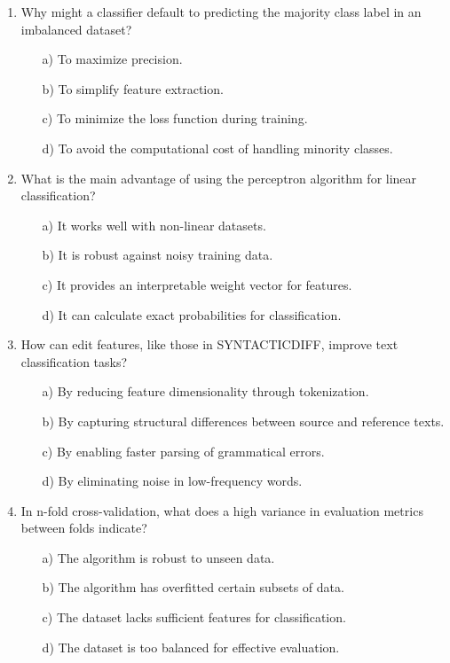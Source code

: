 \documentclass[8pt]{extarticle}
\begin{document}
\begin{multicols}{2}
\begin{enumerate}
\item Why might a classifier default to predicting the majority class label in an imbalanced dataset?
\begin{itemize}
\item[a)] To maximize precision.
\item[b)] To simplify feature extraction.
\item[c)] To minimize the loss function during training.
\item[d)] To avoid the computational cost of handling minority classes.
\end{itemize}


\item What is the main advantage of using the perceptron algorithm for linear classification?
\begin{itemize}
\item[a)] It works well with non-linear datasets.
\item[b)] It is robust against noisy training data.
\item[c)] It provides an interpretable weight vector for features.
\item[d)] It can calculate exact probabilities for classification.
\end{itemize}



\item How can edit features, like those in SYNTACTICDIFF, improve text classification tasks?
\begin{itemize}
\item[a)] By reducing feature dimensionality through tokenization.
\item[b)] By capturing structural differences between source and reference texts.
\item[c)] By enabling faster parsing of grammatical errors.
\item[d)] By eliminating noise in low-frequency words.
\end{itemize}


\item In n-fold cross-validation, what does a high variance in evaluation metrics between folds indicate?
\begin{itemize}
\item[a)] The algorithm is robust to unseen data.
\item[b)] The algorithm has overfitted certain subsets of data.
\item[c)] The dataset lacks sufficient features for classification.
\item[d)] The dataset is too balanced for effective evaluation.
\end{itemize}



\end{enumerate}
\end{multicols}
\end{document}
